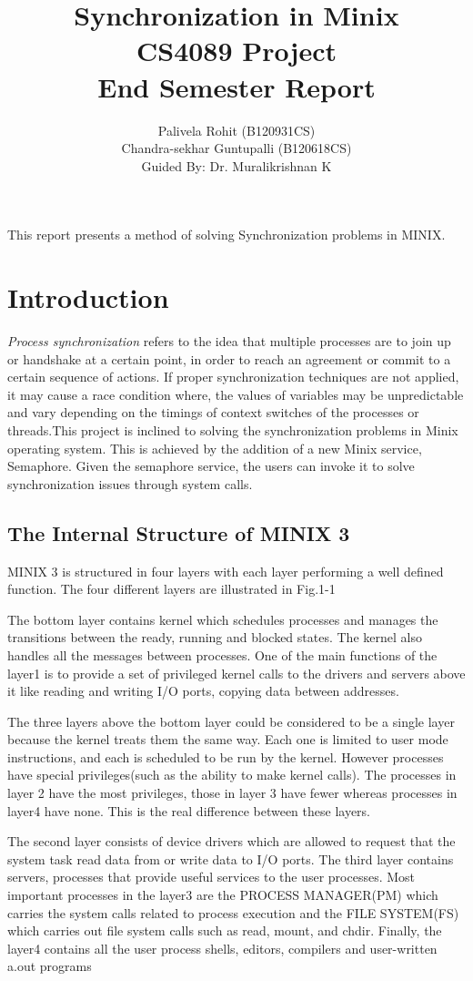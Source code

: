 \documentclass[a4paper,11pt,twocolumn]{article}
\title{Synchronization in Minix\\ {\normalsize CS4089 Project\\End Semester Report}}
\author{Palivela Rohit (B120931CS)\\ Chandra-sekhar Guntupalli (B120618CS)\\Guided By: Dr. Muralikrishnan K}
\begin{document}
\maketitle
\abstract{} 
This report presents a method of solving Synchronization problems in MINIX. 
\section{Introduction}
\textit{Process synchronization} refers to the idea that multiple processes are to join up or handshake at a certain point, in order to reach an agreement or commit to a certain sequence of actions. If proper synchronization techniques are not applied, it may cause a race condition where, the values of variables may be unpredictable and vary depending on the timings of context switches of the processes or threads.This project is inclined to solving the synchronization problems in Minix operating system. This is achieved by the addition of a new Minix service, Semaphore. Given the semaphore service, the users can invoke it to solve synchronization issues through system calls.
\subsection{The Internal Structure of MINIX 3}
MINIX 3 is structured in four layers with each layer performing a well defined function. The four different layers are illustrated in Fig.1-1

The bottom layer contains kernel which schedules processes and manages the transitions between the ready, running and blocked states. The kernel also handles all the messages between processes. One of the main functions of the layer1 is to provide a set of privileged kernel calls to the drivers and servers above it like reading and writing I/O ports, copying data between addresses.

The three layers above the bottom layer could be considered to be a single layer because the kernel treats them the same way. Each one is limited to user mode instructions, and each is scheduled to be run by the kernel. However processes have special privileges(such as the ability to make kernel calls). The processes in layer 2 have the most privileges, those in layer 3 have fewer whereas processes in layer4 have none. This is the real difference between these layers.

The second layer consists of device drivers which are allowed to request that the system task read data from or write data to I/O ports. The third layer contains servers, processes that provide useful services to the user processes. Most important processes in the layer3 are the PROCESS MANAGER(PM) which carries the system calls related to process execution and the FILE SYSTEM(FS) which carries out file system calls such as read, mount, and chdir. Finally, the layer4 contains all the user process shells, editors, compilers and user-written a.out programs
\end{document}

